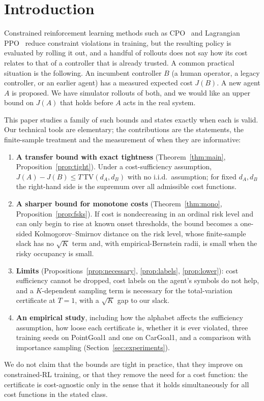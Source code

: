 \documentclass{article}
\newcommand{\TV}{\mathrm{TV}}
\begin{document}
\section{Introduction}
\label{sec:intro}

Constrained reinforcement learning methods such as CPO~\citep{achiam2017cpo} and Lagrangian PPO~\citep{ray2019benchmarking} reduce constraint violations in training, but the resulting policy is evaluated by rolling it out, and a handful of rollouts does not say how its cost relates to that of a controller that is already trusted.
A common practical situation is the following. An incumbent controller $B$ (a human operator, a legacy controller, or an earlier agent) has a measured expected cost $J(B)$. A new agent $A$ is proposed. We have simulator rollouts of both, and we would like an upper bound on $J(A)$ that holds before $A$ acts in the real system.

This paper studies a family of such bounds and states exactly when each is valid. Our technical tools are elementary; the contributions are the statements, the finite-sample treatment and the measurement of when they are informative:
\begin{enumerate}
  \item \textbf{A transfer bound with exact tightness} (Theorem~\ref{thm:main}, Proposition~\ref{prop:tight}). Under a cost-sufficiency assumption, $J(A)-J(B)\le T\,\TV(d_A,d_B)$ with no i.i.d.\ assumption; for fixed $d_A,d_B$ the right-hand side is the supremum over all admissible cost functions.
  \item \textbf{A sharper bound for monotone costs} (Theorem~\ref{thm:mono}, Proposition~\ref{prop:fsks}). If cost is nondecreasing in an ordinal risk level and can only begin to rise at known onset thresholds, the bound becomes a one-sided Kolmogorov--Smirnov distance on the risk level, whose finite-sample slack has no $\sqrt K$ term and, with empirical-Bernstein radii, is small when the risky occupancy is small.
  \item \textbf{Limits} (Propositions~\ref{prop:necessary}, \ref{prop:labels}, \ref{prop:lower}): cost sufficiency cannot be dropped, cost labels on the agent's symbols do not help, and a $K$-dependent sampling term is necessary for the total-variation certificate at $T{=}1$, with a $\sqrt K$ gap to our slack.
  \item \textbf{An empirical study}, including how the alphabet affects the sufficiency assumption, how loose each certificate is, whether it is ever violated, three training seeds on PointGoal1 and one on CarGoal1, and a comparison with importance sampling (Section~\ref{sec:experiments}).
\end{enumerate}
We do not claim that the bounds are tight in practice, that they improve on constrained-RL training, or that they remove the need for a cost function: the certificate is cost-agnostic only in the sense that it holds simultaneously for all cost functions in the stated class.
\end{document}
